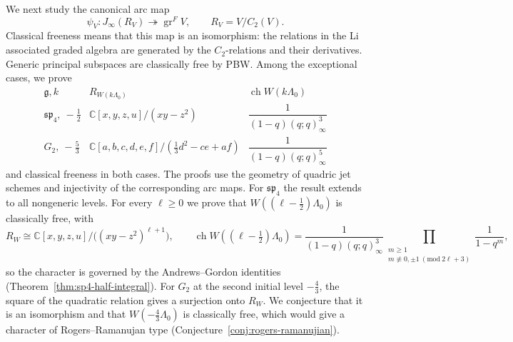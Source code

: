 \documentclass[11pt]{amsart}
\theoremstyle{definition}
\theoremstyle{remark}
\newcommand{\C}{\mathbb C}
\newcommand{\g}{\mathfrak g}
\newcommand{\J}{J_\infty}
\DeclareMathOperator{\gr}{gr}
\DeclareMathOperator{\ch}{ch}
\begin{document}
We next study the canonical arc map
\begin{equation}\label{eq:intro-arcmap}
 \psi_V:\J(R_V)\twoheadrightarrow\gr^F V,
 \qquad R_V=V/C_2(V).
\end{equation}
Classical freeness means that this map is an isomorphism: the relations in
the Li associated graded algebra are generated by the $C_2$-relations and their
derivatives. Generic principal subspaces are classically free by PBW.
Among the exceptional cases, we prove
\[
\begin{array}{c|c|c}
\g, k&R_{W(k\Lambda_0)}&\ch W(k\Lambda_0)\\\hline
\mathfrak{sp}_4,\ -\frac12&
\C[x,y,z,u]/(xy-z^2)&\dfrac1{(1-q)(q;q)_\infty^3}\\[5pt]
G_2,\ -\frac53&
\C[a,b,c,d,e,f]/(\frac13d^2-ce+af)&
\dfrac1{(1-q)(q;q)_\infty^5}
\end{array}
\]
and classical freeness in both cases. The proofs use the geometry of
quadric jet schemes and injectivity of the corresponding arc maps. 
For $\mathfrak{sp}_4$ the result extends to all nongeneric levels. For every
$\ell\ge 0$ we prove that $W((\ell-\tfrac12)\Lambda_0)$ is classically free, with
\[
R_{W}\cong \mathbb C[x,y,z,u]/\bigl((xy-z^2)^{\ell+1}\bigr),\qquad
\operatorname{ch}W((\ell-\tfrac12)\Lambda_0)=\frac{1}{(1-q)(q;q)_\infty^3}
\prod_{\substack{m\ge 1\\ m\not\equiv 0,\pm1 \ (\mathrm{mod}\ 2\ell+3)}}\frac{1}{1-q^m},
\]
so the character is governed by the Andrews--Gordon identities
(Theorem~\ref{thm:sp4-half-integral}). For $G_2$ at the second initial level $-\tfrac43$,
the square of the quadratic relation gives a surjection onto $R_W$. We conjecture
that it is an isomorphism and that $W(-\tfrac43\Lambda_0)$ is classically free, which
would give a character of Rogers--Ramanujan type (Conjecture~\ref{conj:rogers-ramanujian}).
\end{document}
